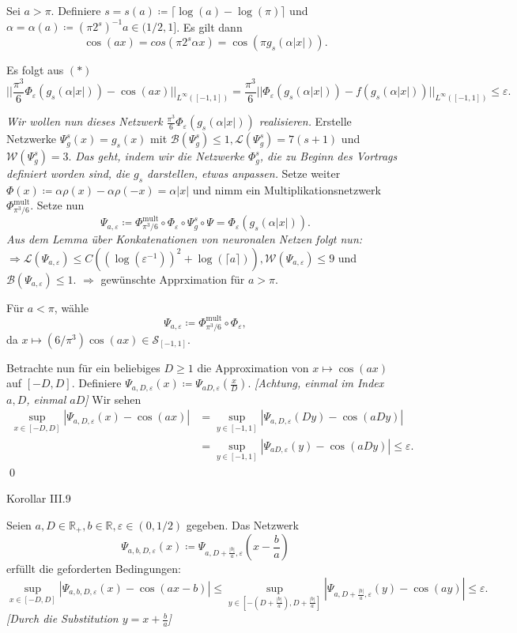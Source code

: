 \documentclass[12pt]{article}
\newcommand{\R}{\mathbb{R}} %
\begin{document}
Sei \(a > \pi\). Definiere \(s = s(a) \coloneqq \lceil \log(a) - \log(\pi) \rceil\) und \(\alpha = \alpha(a) \coloneqq (\pi 2^s)^{-1}a \in (1/2, 1]\). 
Es gilt dann 
\[ \cos(ax) = cos(\pi 2^s \alpha x) = \cos(\pi g_s(\alpha |x|)). \]

Es folgt aus \((*)\)
\[ || \frac{\pi^3}{6} \Phi_\varepsilon (g_s(\alpha |x|)) - \cos(ax) ||_{L^{\infty}([-1,1])} = \frac{\pi^3}{6} ||\Phi_\varepsilon (g_s(\alpha |x|)) - f(g_s(\alpha |x|))||_{L^\infty ([-1,1])} \leq \varepsilon. \]

\textit{Wir wollen nun dieses Netzwerk \(\frac{\pi^3}{6} \Phi_\varepsilon (g_s(\alpha |x|))\) realisieren.}
Erstelle Netzwerke \(\Psi_g^s(x) = g_s(x)\) mit \(\mathcal{B}(\Psi_g^s) \leq 1, \mathcal{L}(\Psi_g^s ) = 7(s+1)\) und \(\mathcal{W}(\Psi_g^s) = 3\).
\textit{Das geht, indem wir die Netzwerke \(\Phi_g^s\), die zu Beginn des Vortrags definiert worden sind, die \(g_s\) darstellen, etwas anpassen.}
Setze weiter \(\Phi(x) \coloneqq \alpha \rho(x) - \alpha \rho(-x) = \alpha |x|\) 
und nimm ein Multiplikationsnetzwerk \(\Phi_{\pi^3/6}^{\text{mult}}\). Setze nun 
\[ \Psi_{a,\varepsilon} \coloneqq \Phi_{\pi^3/6}^{\text{mult}} \circ \Phi_\varepsilon \circ \Psi_g^s \circ \Psi = \Phi_\varepsilon(g_s(\alpha |x|)). \]
\textit{Aus dem Lemma über Konkatenationen von neuronalen Netzen folgt nun:}
\(\Rightarrow \mathcal{L}(\Psi_{a,\varepsilon}) \leq C ((\log(\varepsilon^{-1}))^2 + \log(\lceil a \rceil) ), \mathcal{W}(\Psi_{a,\varepsilon}) \leq 9\) 
und \( \mathcal{B}(\Psi_{a,\varepsilon}) \leq 1 \). 
\(\Rightarrow\) gewünschte Apprximation für \(a > \pi\).

Für \(a < \pi\), wähle 
\[ \Psi_{a,\varepsilon} \coloneqq \Phi_{\pi^3/6}^{\text{mult}} \circ \Phi_\varepsilon,  \]
da \(x\mapsto (6/\pi^3) \cos(ax) \in \mathcal{S}_{[-1,1]}\).

Betrachte nun für ein beliebiges \(D\geq 1\) die Approximation von \(x \mapsto \cos(ax)\) auf \([-D,D]\). 
Definiere \(\Psi_{a,D,\varepsilon}(x) \coloneqq \Psi_{aD,\varepsilon}(\frac{x}{D})\). \textit{[Achtung, einmal im Index \(a,D\), einmal \(aD\)]} Wir sehen 
\begin{align*}
    \sup_{x\in [-D,D]} |\Psi_{a,D,\varepsilon}(x) - \cos(ax)| &= \sup_{y\in [-1,1]} |\Psi_{a,D,\varepsilon} (Dy) - \cos(aDy) | \\
    &= \sup_{y\in [-1,1]} |\Psi_{aD,\varepsilon}(y) - \cos(aDy)| \leq \varepsilon. 
\end{align*}\qed

\newpage

{\Large Korollar III.9}

Seien \(a,D\in \R_+, b\in \R, \varepsilon \in (0, 1/2)\) gegeben. 
Das Netzwerk 
\[ \Psi_{a,b,D,\varepsilon}(x) \coloneqq \Psi_{a, D + \frac{|b|}{a}, \varepsilon}(x - \frac{b}{a}) \]
erfüllt die geforderten Bedingungen: 
\[ \sup_{x\in [-D,D]} |\Psi_{a,b,D,\varepsilon}(x) - \cos(ax-b) | \leq \sup_{y \in [-(D+\frac{|b|}{a}), D+ \frac{|b|}{a}]} |\Psi_{a,D+\frac{|b|}{a},\varepsilon}(y) - \cos(ay)| \leq \varepsilon. \]
\textit{[Durch die Substitution \(y = x + \frac{b}{a}\)]}
\end{document}
